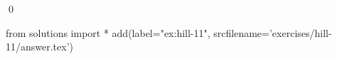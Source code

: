 
\begin{ex} 
  \label{ex:hill-11}
  
  \qed
\end{ex} 
\begin{python0}
from solutions import *
add(label="ex:hill-11",
    srcfilename='exercises/hill-11/answer.tex') 
\end{python0}
